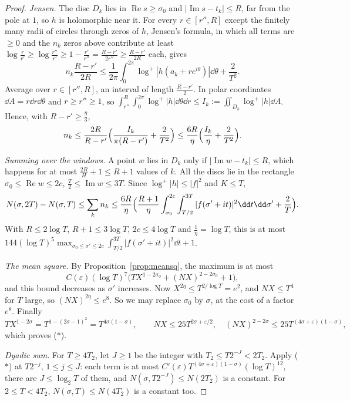 \begin{proof}
\emph{Jensen.} The disc $D_k$ lies in $\operatorname{Re}s\ge\sigma_0$ and $|\operatorname{Im}s-t_k|\le R$, far from the pole at $1$, so $h$ is holomorphic near it. For every $r\in[r'',R]$ except the finitely many radii of circles through zeros of $h$, Jensen's formula, in which all terms are $\ge0$ and the $n_k$ zeros above contribute at least $\log\frac r{r'}\ge\log\frac{r''}{r'}\ge1-\frac{r'}{r''}=\frac{R-r'}{2r''}\ge\frac{R-r'}{2R}$ each, gives
\[
n_k\frac{R-r'}{2R}\le\frac1{2\pi}\int_0^{2\pi}\log^+|h(a_k+re^{i\theta})|\dd\theta+\frac2{T^2}.
\]
Average over $r\in[r'',R]$, an interval of length $\frac{R-r'}2$. In polar coordinates $\dd A=r\dd r\dd\theta$ and $r\ge r''\ge1$, so $\int_{r''}^R\int_0^{2\pi}\log^+|h|\dd\theta\dd r\le I_k:=\iint_{D_k}\log^+|h|\dd A$. Hence, with $R-r'\ge\frac\eta3$,
\[
n_k\le\frac{2R}{R-r'}\Bigl(\frac{I_k}{\pi(R-r')}+\frac2{T^2}\Bigr)\le\frac{6R}\eta\Bigl(\frac{I_k}\eta+\frac2{T^2}\Bigr).
\]

\emph{Summing over the windows.} A point $w$ lies in $D_k$ only if $|\operatorname{Im}w-t_k|\le R$, which happens for at most $\frac{2R}H+1\le R+1$ values of $k$. All the discs lie in the rectangle $\sigma_0\le\operatorname{Re}w\le2c$, $\frac T2\le\operatorname{Im}w\le3T$. Since $\log^+|h|\le|f|^2$ and $K\le T$,
\[
N(\sigma,2T)-N(\sigma,T)\le\sum_kn_k\le\frac{6R}\eta\Bigl(\frac{R+1}\eta\int_{\sigma_0}^{2c}\int_{T/2}^{3T}|f(\sigma'+it)|^2\dd t\dd\sigma'+\frac2T\Bigr).
\]
With $R\le2\log T$, $R+1\le3\log T$, $2c\le4\log T$ and $\frac1\eta=\log T$, this is at most $144(\log T)^5\max_{\sigma_0\le\sigma'\le2c}\int_{T/2}^{3T}|f(\sigma'+it)|^2\dd t+1$.

\emph{The mean square.} By Proposition~\ref{prop:meansq}, the maximum is at most
\[
C(\varepsilon)(\log T)^7\bigl(TX^{1-2\sigma_0}+(NX)^{2-2\sigma_0}+1\bigr),
\]
and this bound decreases as $\sigma'$ increases. Now $X^{2\eta}\le T^{2/\log T}=e^2$, and $NX\le T^4$ for $T$ large, so $(NX)^{2\eta}\le e^8$. So we may replace $\sigma_0$ by $\sigma$, at the cost of a factor $e^8$. Finally
\[
TX^{1-2\sigma}=T^{1-(2\sigma-1)^2}=T^{4\sigma(1-\sigma)},\qquad NX\le25T^{2\sigma+\varepsilon/2},\quad(NX)^{2-2\sigma}\le25T^{(4\sigma+\varepsilon)(1-\sigma)},
\]
which proves ($*$).

\emph{Dyadic sum.} For $T\ge4T_2$, let $J\ge1$ be the integer with $T_2\le T2^{-J}<2T_2$. Apply ($*$) at $T2^{-j}$, $1\le j\le J$: each term is at most $C'(\varepsilon)T^{(4\sigma+\varepsilon)(1-\sigma)}(\log T)^{12}$, there are $J\le\log_2T$ of them, and $N(\sigma,T2^{-J})\le N(2T_2)$ is a constant. For $2\le T<4T_2$, $N(\sigma,T)\le N(4T_2)$ is a constant too.
\end{proof}

